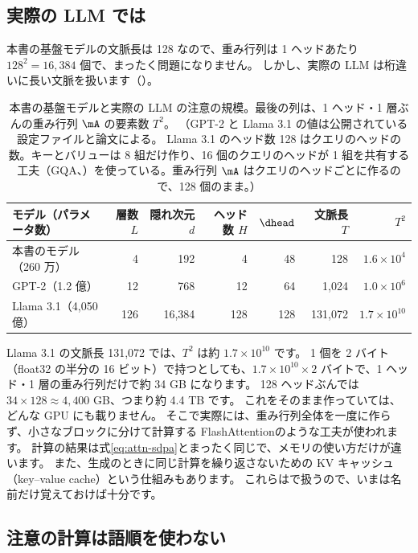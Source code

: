 \subsection*{実際の LLM では}

本書の基盤モデルの文脈長は 128 なので、重み行列は 1 ヘッドあたり $128^2=16{,}384$ 個で、まったく問題になりません。
しかし、実際の LLM は桁違いに長い文脈を扱います（）。

\begin{table}[tbp]
\centering
\caption{本書の基盤モデルと実際の LLM の注意の規模。最後の列は、1 ヘッド・1 層ぶんの重み行列 $\mA$ の要素数 $T^2$。
（GPT-2 と Llama 3.1 の値は公開されている設定ファイルと論文\cite{radford2019language,dubey2024llama3}による。
Llama 3.1 のヘッド数 128 はクエリのヘッドの数。キーとバリューは 8 組だけ作り、16 個のクエリのヘッドが 1 組を共有する工夫（GQA、）を使っている。重み行列 $\mA$ はクエリのヘッドごとに作るので、128 個のまま。）}
\label{tab:attn-scale}
\small\setlength{\tabcolsep}{4pt}
\begin{tabular}{lrrrrrr}
\toprule
モデル（パラメータ数） & 層数 $L$ & 隠れ次元 $d$ & ヘッド数 $H$ & $\dhead$ & 文脈長 $T$ & $T^2$ \\
\midrule
本書のモデル（260 万） & 4 & 192 & 4 & 48 & 128 & $1.6\times10^4$ \\
GPT-2（1.2 億） & 12 & 768 & 12 & 64 & 1,024 & $1.0\times10^6$ \\
Llama 3.1（4,050 億） & 126 & 16,384 & 128 & 128 & 131,072 & $1.7\times10^{10}$ \\
\bottomrule
\end{tabular}
\end{table}

Llama 3.1 の文脈長 131,072 では、$T^2$ は約 $1.7\times10^{10}$ です。
1 個を 2 バイト（float32 の半分の 16 ビット）で持つとしても、$1.7\times10^{10}\times2$ バイトで、1 ヘッド・1 層の重み行列だけで約 34 GB になります。
128 ヘッドぶんでは $34\times128\approx4{,}400$ GB、つまり約 4.4 TB です。
これをそのまま作っていては、どんな GPU にも載りません。
そこで実際には、重み行列全体を一度に作らず、小さなブロックに分けて計算する FlashAttention\cite{dao2022flashattention}のような工夫が使われます。
計算の結果は式\eqref{eq:attn-sdpa}とまったく同じで、メモリの使い方だけが違います。
また、生成のときに同じ計算を繰り返さないための KV キャッシュ（key–value cache）という仕組みもあります。
これらはで扱うので、いまは名前だけ覚えておけば十分です。

\subsection*{注意の計算は語順を使わない}

